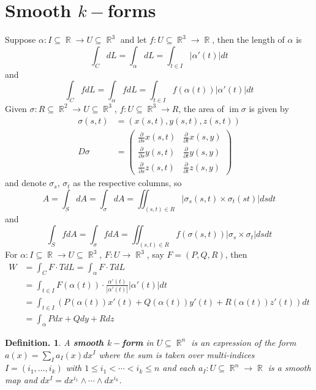 \documentclass[11pt, a4paper]{memoir}
\DeclareMathOperator{\R}{{\mathbb{R}}}
\theoremstyle{change}
\theoremstyle{plain}
\theoremstyle{nonumberplain}
\newtheorem{definition}{Definition.}
\DeclareMathOperator{\im}{im}
\newcommand{\prt}[2]{\ensuremath{\frac{\partial #1}{\partial #2}}}
\numberwithin{equation}{section}
\begin{document}
\section{Smooth \texorpdfstring{$k-$}{k-}forms}
Suppose $\alpha:I\subseteq\R\to U\subseteq\R^3$ and let $f:U\subseteq\R^3\to\R$, then the length of $\alpha$ is
\begin{equation*}
    \int_C dL=\int_\alpha dL=\int_{t\in I}|\alpha'(t)|dt
\end{equation*}
and
\begin{equation*}
    \int_C fdL = \int_\alpha f dL=\int_{t\in I}f(\alpha(t))|\alpha'(t)|dt
\end{equation*}
Given $\sigma:R\subseteq\R^2\to U\subseteq\R^3$, $f:U\subseteq\R^3\to R$, the area of $\im \sigma$ is given by
\begin{align*}
    \sigma(s,t)&=(x(s,t),y(s,t),z(s,t))\\
    D\sigma&=
    \begin{pmatrix}
        \prt{}{s}x(s,t) & \prt{}{t}x(s,y)\\
        \prt{}{s}y(s,t) & \prt{}{t}y(s,y)\\
        \prt{}{s}z(s,t) & \prt{}{t}z(s,y)
    \end{pmatrix}
\end{align*}
and denote $\sigma_s$, $\sigma_t$ as the respective columns, so
\begin{equation*}
    A = \int_S dA=\int_\sigma dA=\iint_{(s,t)\in R}|\sigma_s(s,t)\times\sigma_t(st)|dsdt
\end{equation*}
and
\begin{equation*}
    \int_S fdA=\int_\sigma fdA=\iint_{(s,t)\in R}f(\sigma(s,t))|\sigma_s\times\sigma_t|ds dt
\end{equation*}
For $\alpha:I\subseteq\R\to U\subseteq\R^3$, $F:U\to\R^3$, say $F=(P,Q,R)$, then
\begin{align*}
    W &= \int_CF\cdot TdL = \int_\alpha F\cdot TdL\\
      &= \int_{t\in I}F(\alpha(t))\cdot\frac{\alpha'(t)}{|\alpha'(t)|}|\alpha'(t)|dt\\
      &= \int_{t\in I}(P(\alpha(t))x'(t)+Q(\alpha(t))y'(t)+R(\alpha(t))z'(t))dt\\
      &= \int_\alpha Pdx+Qdy+Rdz
\end{align*}
\begin{definition}
    A \textbf{smooth $k-$form} in $U\subseteq\R^n$ is an expression of the form $a(x)=\sum_Ia_I(x) dx^I$ where the sum is taken over multi-indices $I=(i_1,\ldots,i_k)$ with $1\leq i_1<\cdots<i_k\leq n$ and each $a_I:U\subseteq\R^n\to\R$ is a smooth map and $dx^I=dx^{i_1}\wedge\cdots\wedge dx^{i_k}$.
\end{definition}
\end{document}

